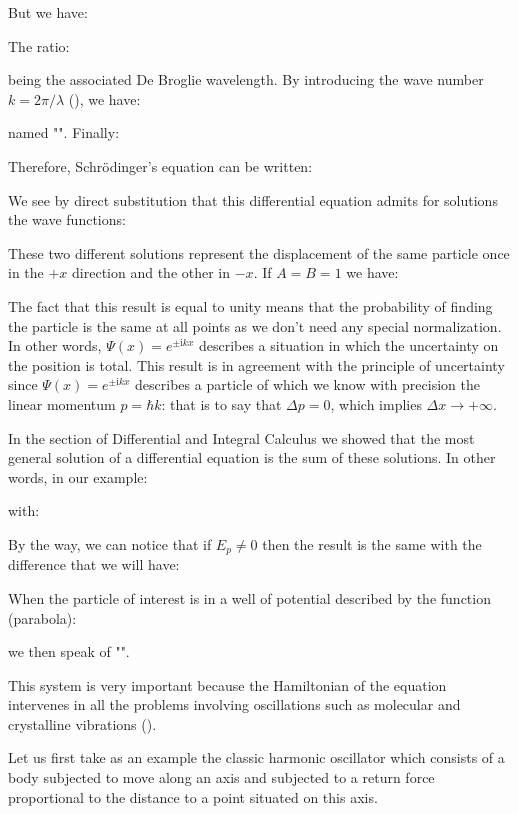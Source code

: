	But we have:
	
	The ratio:
	
	being the associated De Broglie wavelength. By introducing the wave number $k=2\pi/\lambda$ (), we have:
	
	named "". Finally:
	
	Therefore, Schrödinger's equation can be written:
	
	We see by direct substitution that this differential equation admits for solutions the wave functions:
	
	These two different solutions represent the displacement of the same particle once in the $+x$ direction and the other in $-x$. If $A=B=1$ we have:
	
	The fact that this result is equal to unity means that the probability of finding the particle is the same at all points as we don't need any special normalization. In other words, $\Psi(x)=e^{\pm\mathrm{i}kx}$ describes a situation in which the uncertainty on the position is total. This result is in agreement with the principle of uncertainty since $\Psi(x)=e^{\pm\mathrm{i}kx}$  describes a particle of which we know with precision the linear momentum $p=\hbar k$: that is to say that $\Delta p=0$, which implies $\Delta x\rightarrow +\infty$.

	In the section of Differential and Integral Calculus we showed that the most general solution of a differential equation is the sum of these solutions. In other words, in our example:
	
	with:
	
	By the way, we can notice that if $E_p\neq 0$ then the result is the same with the difference that we will have:
	
	When the particle of interest is in a well of potential described by the function (parabola):
	
	we then speak of "".

	This system is very important because the Hamiltonian of the equation intervenes in all the problems involving oscillations such as molecular and crystalline vibrations ().

	Let us first take as an example the classic harmonic oscillator which consists of a body subjected to move along an axis and subjected to a return force proportional to the distance to a point situated on this axis.

